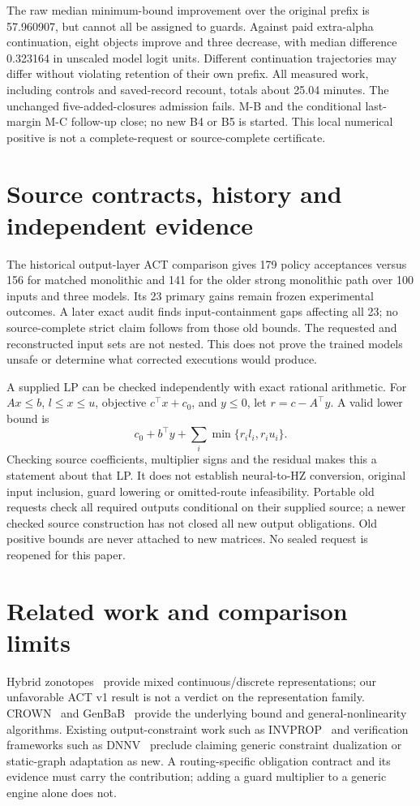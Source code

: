 \documentclass[11pt]{article}
\begin{document}
The raw median minimum-bound improvement over the original prefix is 57.960907,
but cannot all be assigned to guards. Against paid extra-alpha continuation,
eight objects improve and three decrease, with median difference 0.323164 in
unscaled model logit units. Different continuation trajectories may differ
without violating retention of their own prefix. All measured work, including
controls and saved-record recount, totals about 25.04 minutes. The unchanged
five-added-closures admission fails. M-B and the conditional last-margin M-C
follow-up close; no new B4 or B5 is started. This local numerical positive is
not a complete-request or source-complete certificate.

\section{Source contracts, history and independent evidence}
The historical output-layer ACT comparison gives 179 policy acceptances versus
156 for matched monolithic and 141 for the older strong monolithic path over
100 inputs and three models. Its 23 primary gains remain frozen experimental
outcomes. A later exact audit finds input-containment gaps affecting all 23;
no source-complete strict claim follows from those old bounds. The requested
and reconstructed input sets are not nested. This does not prove the trained
models unsafe or determine what corrected executions would produce.

A supplied LP can be checked independently with exact rational arithmetic.
For $Ax\leq b$, $l\leq x\leq u$, objective $c^\top x+c_0$, and $y\leq0$,
let $r=c-A^\top y$. A valid lower bound is
\[
 c_0+b^\top y+\sum_i\min\{r_i l_i,r_i u_i\}.
\]
Checking source coefficients, multiplier signs and the residual makes this a
statement about that LP. It does not establish neural-to-HZ conversion, original
input inclusion, guard lowering or omitted-route infeasibility. Portable old
requests check all required outputs conditional on their supplied source;
a newer checked source construction has not closed all new output obligations.
Old positive bounds are never attached to new matrices. No sealed request is
reopened for this paper.

\section{Related work and comparison limits}
Hybrid zonotopes~\cite{hz} provide mixed continuous/discrete representations;
our unfavorable ACT v1 result is not a verdict on the representation family.
CROWN~\cite{crown} and GenBaB~\cite{genbab} provide the underlying bound and
general-nonlinearity algorithms. Existing output-constraint work such as
INVPROP~\cite{invprop} and verification frameworks such as DNNV~\cite{dnnv}
preclude claiming generic constraint dualization or static-graph adaptation as
new. A routing-specific obligation contract and its evidence must carry the
contribution; adding a guard multiplier to a generic engine alone does not.
\end{document}
